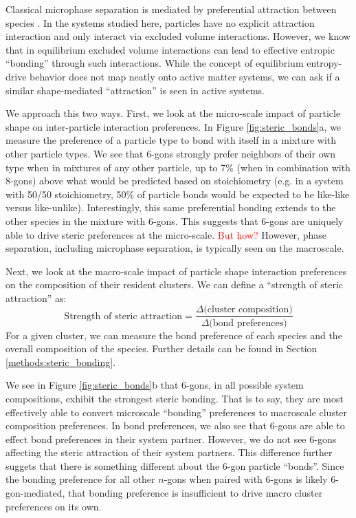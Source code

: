 \begin{figure*}[t]
\begin{figure*}[t]
Classical microphase separation is mediated by preferential attraction between species \cite{}.
In the systems studied here, particles have no explicit attraction interaction and only interact via excluded volume interactions.
However, we know that in equilibrium excluded volume interactions can lead to effective entropic ``bonding'' through such interactions\cite{entropic_bonds}.
While the concept of equilibrium entropy-drive behavior does not map neatly onto active matter systems, we can ask if a similar shape-mediated ``attraction'' is seen in active systems.

We approach this two ways.
First, we look at the micro-scale impact of particle shape on inter-particle interaction preferences.
In Figure \ref{fig:steric_bonds}a, we measure the preference of a particle type to bond with itself in a mixture with other particle types.
We see that 6-gons strongly prefer neighbors of their own type when in mixtures of any other particle, up to 7\% (when in combination with 8-gons) above what would be predicted based on stoichiometry (e.g. in a system with 50/50 stoichiometry, 50\% of particle bonds would be expected to be like-like versus like-unlike).
Interestingly, this same preferential bonding extends to the other species in the mixture with 6-gons.
This suggests that 6-gons are uniquely able to drive steric preferences at the micro-scale.
\textcolor{red}{But how?}
However, phase separation, including microphase separation, is typically seen on the macroscale.

Next, we look at the macro-scale impact of particle shape interaction preferences on the composition of their resident clusters.
We can define a ``strength of steric attraction'' as:
\begin{equation}
\text{Strength of steric attraction} = \frac{\Delta\text{(cluster composition)}}{\Delta\text{(bond preferences)}}
\end{equation}
For a given cluster, we can measure the bond preference of each species and the overall composition of the species.
Further details can be found in Section \ref{methods:steric_bonding}.

We see in Figure \ref{fig:steric_bonds}b that 6-gons, in all possible system compositions, exhibit the strongest steric bonding.
That is to say, they are most effectively able to convert microscale ``bonding'' preferences to macroscale cluster composition preferences.
In bond preferences, we also see that 6-gons are able to effect bond preferences in their system partner.
However, we do not see 6-gons affecting the steric attraction of their system partners.
This difference further suggets that there is something different about the 6-gon particle ``bonds''.
Since the bonding preference for all other $n$-gons when paired with 6-gons is likely 6-gon-mediated, that bonding preference is insufficient to drive macro cluster preferences on its own.


\end{figure*}
\end{figure*}
